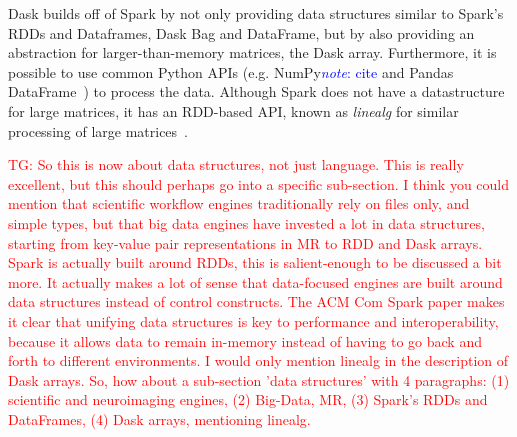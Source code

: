 \documentclass{report}
\newcommand{\note}[1]{\textcolor{blue}{\textit{note}: #1}}
\newcommand{\tristan}[1]{\textcolor{red}{TG: #1}}
\begin{document}
                Dask builds off of Spark by not only providing data 
                structures similar to Spark's RDDs and Dataframes, Dask Bag and 
                DataFrame, but by also providing an abstraction for 
                larger-than-memory matrices, the Dask array. Furthermore, it is
                possible to use common Python APIs (e.g. NumPy\note{cite} and 
                Pandas DataFrame~\cite{mckinney2011pandas}) to process the 
                data. Although Spark does not have a datastructure for large 
                matrices, it has an RDD-based API, known as \textit{linealg}
                for similar processing of large 
                matrices~\cite{BosaghZadeh:2016:MCO:2939672.2939675}.

                
            \tristan{So this is now about data structures, not just language.
            This is really excellent, but this should perhaps go into a 
            specific sub-section. I think you could mention that 
            scientific workflow engines traditionally rely on files 
            only, and simple types, but that big data engines have 
            invested a lot in data structures, starting from key-value 
            pair representations in MR to RDD and Dask arrays. Spark is 
            actually built around RDDs, this is salient-enough to be 
            discussed a bit more. It actually makes a lot of sense that 
            data-focused engines are built around data structures 
            instead of control constructs. The ACM Com Spark paper makes it clear
            that unifying data structures is key to performance and interoperability, 
            because it allows data to remain in-memory instead of having to go back
            and forth to different environments. I would only mention linealg 
            in the description of Dask arrays. So, how about a 
            sub-section 'data structures' with 4 paragraphs: (1) 
            scientific and neuroimaging engines, (2) Big-Data, MR, (3) 
            Spark's RDDs and DataFrames, (4) Dask arrays, mentioning 
            linealg. } 
\end{document}
